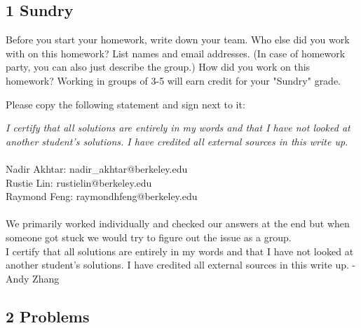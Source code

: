 \documentclass{article}\usepackage{amsmath,amssymb,amsthm,tikz,tkz-graph,color,chngpage,soul,hyperref,csquotes,graphicx,floatrow}\newcommand*{\QEDB}{\hfill\ensuremath{\square}}\newtheorem*{prop}{Proposition}\usepackage[shortlabels]{enumitem}\usepackage[nobreak=true]{mdframed}\usetikzlibrary{matrix,calc}\MakeOuterQuote{"}\usepackage[margin=1in]{geometry} \newtheorem{theorem}{Theorem} \usepackage{circuitikz}
\begin{document}
\subsection*{1 Sundry}
\item Before you start your homework, write down your team. Who else did you work with on this homework? List names and email addresses. (In case of homework party, you can also just describe the group.) How did you work on this homework? Working in groups of 3-5 will earn credit for your "Sundry" grade.
\item Please copy the following statement and sign next to it:
\item \textit{I certify that all solutions are entirely in my words and that I have not looked at another student’s solutions. I have credited all external sources in this write up.}
\\
\\
Nadir Akhtar: nadir\_akhtar@berkeley.edu\\
Rustie Lin: rustielin@berkeley.edu\\
Raymond Feng: raymondhfeng@berkeley.edu\\
\\
    We primarily worked individually and checked our answers at the end but when someone got stuck we would try to figure out the issue as a group.\\

I certify that all solutions are entirely in my words and that I have not looked at another student’s solutions. I have credited all external sources in this write up. - Andy Zhang
\clearpage


\subsection*{2 Problems}
\end{document}
